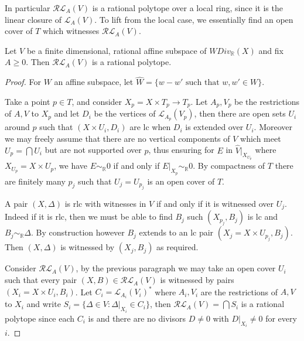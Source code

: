 	
	In particular $\mathcal{RL}_{A}(V)$ is a rational polytope over a local ring, since it is the linear closure of $\mathcal{L}_{A}(V)$. To lift from the local case, we essentially find an open cover of $T$ which witnesses $\mathcal{RL}_{A}(V)$.
	
	\begin{theorem}\label{rlt-poly}
		Let $V$ be a finite dimensional, rational affine subspace of $WDiv_{\mathbb{R}}(X)$ and fix $A \geq 0$. Then $\mathcal{RL}_{A}(V)$ is a rational polytope.
	\end{theorem}
	
	\begin{proof}
		For $W$ an affine subspace, let $\hat{W}=\{w-w' \text{ such that } w,w' \in W\}$.
		
		Take a point $p \in T$, and consider $X_{p}=X\times T_{p} \to T_{p}$. Let $A_{p},V_{p}$ be the restrictions of $A,V$ to $X_{p}$ and let $D_{i}$ be the vertices of $\mathcal{L}_{A_{p}}(V_{p})$, then there are open sets $U_{i}$ around $p$ such that $(X\times U_{i},D_{i})$ are lc when $D_{i}$ is extended over $U_{i}$. Moreover we may freely assume that there are no vertical components of $V$ which meet $U_{p}= \bigcap U_{i}$ but are not supported over $p$, thus ensuring for $E$ in $\hat{V}|_{X_{U_{p}}}$ where $X_{U_{p}}=X\times U_{p}$, we have $E \sim_{\mathbb{R}} 0$ if and only if $E|_{X_{p}}\sim_{\mathbb{R}} 0$. By compactness of $T$ there are finitely many $p_{j}$ such that $U_{j}=U_{p_{j}}$ is an open cover of $T$. 
		
		A pair $(X,\Delta)$ is rlc with witnesses in $V$ if and only if it is witnessed over $U_{j}$. Indeed if it is rlc, then we must be able to find $B_{j}$ such $(X_{p_{j}},B_{j})$ is lc and $B_{j} \sim_{\mathbb{R}} \Delta$. By construction however $B_{j}$ extends to an lc pair $(X_{j}=X\times U_{p_{j}},B_{j})$. Then $(X,\Delta)$ is witnessed by $(X_{j}, B_{j})$ as required.
		
		Consider $\mathcal{RL}_{A}(V)$, by the previous paragraph we may take an open cover $U_{i}$ such that every pair $(X,B) \in \mathcal{RL}_{A}(V)$ is witnessed by pairs $(X_{i}=X\times U_{i},B_{i})$. Let $C_{i} = \mathcal{L}_{A_{i}}(V_{i})^{*}$ where $A_{i}, V_{i}$ are the restrictions of $A,V$ to $X_{i}$ and write $S_{i}=\{\Delta \in V: \Delta|_{X_{i}} \in C_{i}\}$, then $\mathcal{RL}_{A}(V)= \bigcap S_{i}$ is a rational polytope since each $C_{i}$ is and there are no divisors $D \neq 0$ with $D|_{X_{i}} \neq 0$ for every $i$.
	\end{proof}
	
